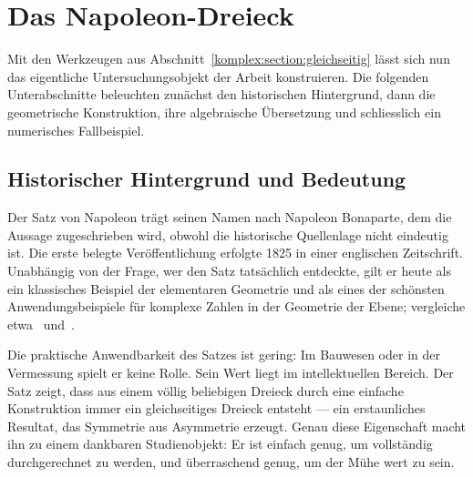 %
%
\section{Das Napoleon-Dreieck
\label{komplex:section:napoleon}}
Mit den Werkzeugen aus Abschnitt~\ref{komplex:section:gleichseitig}
lässt sich nun das eigentliche Untersuchungsobjekt der Arbeit konstruieren.
Die folgenden Unterabschnitte beleuchten zunächst den historischen
Hintergrund, dann die geometrische Konstruktion,
ihre algebraische Übersetzung und schliesslich ein numerisches
Fallbeispiel.

%
%
\subsection{Historischer Hintergrund und Bedeutung
\label{komplex:subsection:historisch}}
Der Satz von Napoleon trägt seinen Namen nach Napoleon Bonaparte,
%
dem die Aussage zugeschrieben wird,
obwohl die historische Quellenlage nicht eindeutig ist.
Die erste belegte Veröffentlichung erfolgte 1825 in einer englischen
Zeitschrift.
Unabhängig von der Frage, wer den Satz tatsächlich entdeckte,
gilt er heute als ein klassisches Beispiel der elementaren Geometrie
und als eines der schönsten Anwendungsbeispiele für komplexe Zahlen
in der Geometrie der Ebene; vergleiche etwa~\cite{komplex:wells}
und~\cite{komplex:coxeter}.

Die praktische Anwendbarkeit des Satzes ist gering:
Im Bauwesen oder in der Vermessung spielt er keine Rolle.
Sein Wert liegt im intellektuellen Bereich.
Der Satz zeigt, dass aus einem völlig beliebigen Dreieck durch eine
einfache Konstruktion immer ein gleichseitiges Dreieck entsteht ---
ein erstaunliches Resultat, das Symmetrie aus Asymmetrie erzeugt.
Genau diese Eigenschaft macht ihn zu einem dankbaren Studienobjekt:
Er ist einfach genug, um vollständig durchgerechnet zu werden,
und überraschend genug, um der Mühe wert zu sein.

%
%
